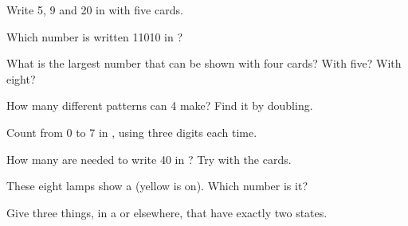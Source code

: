 \begin{exercise}[$\star$]\label{exo:g5:bits-and-bytes:1}
Write 5, 9 and 20 in  with five cards.
\end{exercise}

\begin{exercise}[$\star$]\label{exo:g5:bits-and-bytes:2}
Which number is written 11010 in ?
\end{exercise}

\begin{exercise}[$\star$]\label{exo:g5:bits-and-bytes:3}
What is the largest number that can be shown with four cards? With five? With
eight?
\end{exercise}

\begin{exercise}[$\star$]\label{exo:g5:bits-and-bytes:4}
How many different patterns can 4  make? Find it by doubling.
\end{exercise}

\begin{exercise}[$\star$]\label{exo:g5:bits-and-bytes:5}
Count from 0 to 7 in , using three digits each time.
\end{exercise}

\begin{exercise}[$\star$]\label{exo:g5:bits-and-bytes:6}
How many  are needed to write 40 in ? Try with the cards.
\end{exercise}

\begin{exercise}[$\star$]\label{exo:g5:bits-and-bytes:7}
These eight lamps show a  (yellow is on). Which number is it?

\begin{center}
\end{center}
\end{exercise}

\begin{exercise}[$\star$]\label{exo:g5:bits-and-bytes:8}
Give three things, in a  or elsewhere, that have exactly two states.
\end{exercise}

